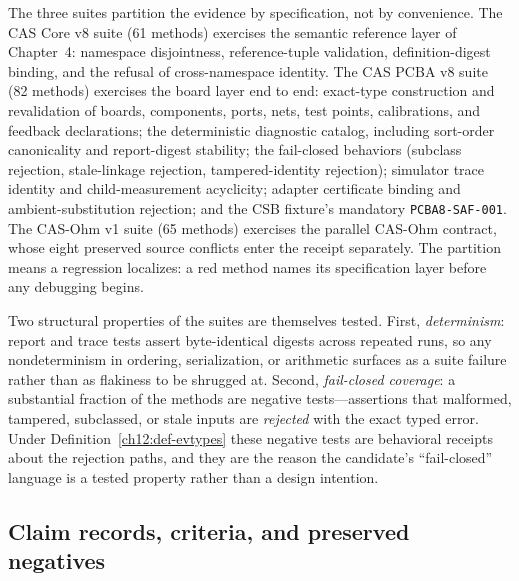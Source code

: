 The three suites partition the evidence by specification, not by convenience. The CAS Core v8 suite (61 methods) exercises the semantic reference layer of Chapter~4: namespace disjointness, reference-tuple validation, definition-digest binding, and the refusal of cross-namespace identity. The CAS PCBA v8 suite (82 methods) exercises the board layer end to end: exact-type construction and revalidation of boards, components, ports, nets, test points, calibrations, and feedback declarations; the deterministic diagnostic catalog, including sort-order canonicality and report-digest stability; the fail-closed behaviors (subclass rejection, stale-linkage rejection, tampered-identity rejection); simulator trace identity and child-measurement acyclicity; adapter certificate binding and ambient-substitution rejection; and the CSB fixture's mandatory \texttt{PCBA8-SAF-001}. The CAS-Ohm v1 suite (65 methods) exercises the parallel CAS-Ohm contract, whose eight preserved source conflicts enter the receipt separately. The partition means a regression localizes: a red method names its specification layer before any debugging begins.

Two structural properties of the suites are themselves tested. First, \emph{determinism}: report and trace tests assert byte-identical digests across repeated runs, so any nondeterminism in ordering, serialization, or arithmetic surfaces as a suite failure rather than as flakiness to be shrugged at. Second, \emph{fail-closed coverage}: a substantial fraction of the methods are negative tests---assertions that malformed, tampered, subclassed, or stale inputs are \emph{rejected} with the exact typed error. Under Definition~\ref{ch12:def-evtypes} these negative tests are behavioral receipts about the rejection paths, and they are the reason the candidate's ``fail-closed'' language is a tested property rather than a design intention.

\subsection{Claim records, criteria, and preserved negatives}

